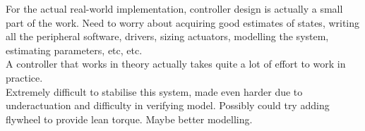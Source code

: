 For the actual real-world implementation, controller design is actually a small part of the work. Need to worry about acquiring good estimates of states, writing all the peripheral software, drivers, sizing actuators, modelling the system, estimating parameters, etc, etc. \\
A controller that works in theory actually takes quite a lot of effort to work in practice.  \\
Extremely difficult to stabilise this system, made even harder due to underactuation and difficulty in verifying model. Possibly could try adding flywheel to provide lean torque. Maybe better modelling.